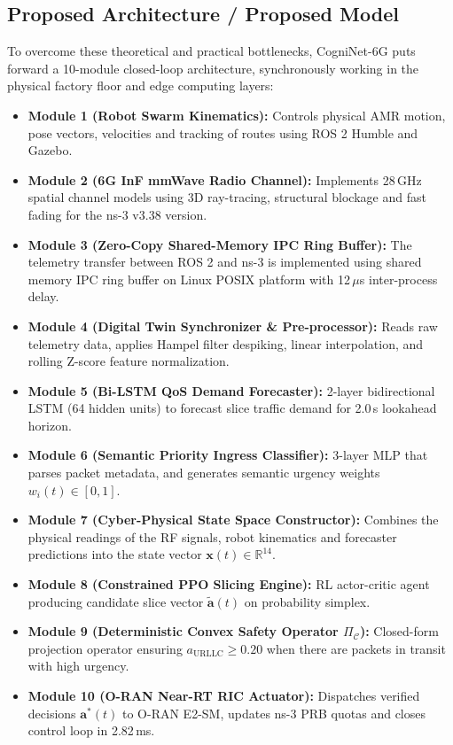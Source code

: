 \documentclass[twocolumn,10pt,twoside]{article}
\begin{document}
\subsection{Proposed Architecture / Proposed Model}
To overcome these theoretical and practical bottlenecks, CogniNet-6G puts forward a 10-module closed-loop architecture, synchronously working in the physical factory floor and edge computing layers:
\begin{itemize}
    \item \textbf{Module 1 (Robot Swarm Kinematics):} Controls physical AMR motion, pose vectors, velocities and tracking of routes using ROS 2 Humble and Gazebo.
    \item \textbf{Module 2 (6G InF mmWave Radio Channel):} Implements 28\,GHz spatial channel models using 3D ray-tracing, structural blockage and fast fading for the ns-3 v3.38 version.
    \item \textbf{Module 3 (Zero-Copy Shared-Memory IPC Ring Buffer):} The telemetry transfer between ROS 2 and ns-3 is implemented using shared memory IPC ring buffer on Linux POSIX platform with 12\,$\mu$s inter-process delay.
    \item \textbf{Module 4 (Digital Twin Synchronizer \& Pre-processor):} Reads raw telemetry data, applies Hampel filter despiking, linear interpolation, and rolling Z-score feature normalization.
    \item \textbf{Module 5 (Bi-LSTM QoS Demand Forecaster):} 2-layer bidirectional LSTM (64 hidden units) to forecast slice traffic demand for 2.0\,s lookahead horizon.
    \item \textbf{Module 6 (Semantic Priority Ingress Classifier):} 3-layer MLP that parses packet metadata, and generates semantic urgency weights $w_i(t) \in [0, 1]$.
    \item \textbf{Module 7 (Cyber-Physical State Space Constructor):} Combines the physical readings of the RF signals, robot kinematics and forecaster predictions into the state vector $\mathbf{x}(t) \in \mathbb{R}^{14}$.
    \item \textbf{Module 8 (Constrained PPO Slicing Engine):} RL actor-critic agent producing candidate slice vector $\tilde{\mathbf{a}}(t)$ on probability simplex.
    \item \textbf{Module 9 (Deterministic Convex Safety Operator $\Pi_{\mathcal{C}}$):} Closed-form projection operator ensuring $a_{\text{URLLC}} \ge 0.20$ when there are packets in transit with high urgency.
    \item \textbf{Module 10 (O-RAN Near-RT RIC Actuator):} Dispatches verified decisions $\mathbf{a}^*(t)$ to O-RAN E2-SM, updates ns-3 PRB quotas and closes control loop in 2.82\,ms.
\end{itemize}
\end{document}
